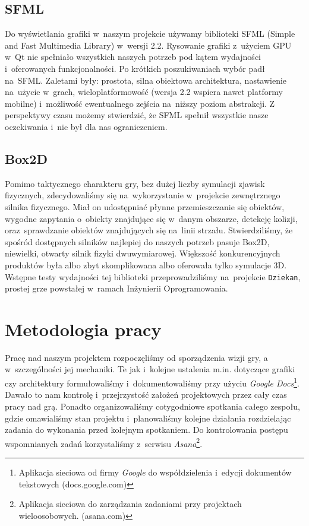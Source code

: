 \documentclass[licencjacka]{pracamgr}
\begin{document}
    \subsection{SFML}
      Do wyświetlania grafiki w~naszym projekcie używamy biblioteki SFML\cite{SFML} (Simple and Fast Multimedia Library) w~wersji
      2.2. Rysowanie grafiki z~użyciem GPU w~Qt nie spełniało wszystkich naszych potrzeb pod kątem wydajności i~oferowanych funkcjonalności.
      Po krótkich poszukiwaniach wybór padł na~SFML. Zaletami były: prostota, silna obiektowa architektura, nastawienie na~użycie w~grach,
      wieloplatformowość (wersja 2.2 wspiera nawet platformy mobilne) i~możliwość ewentualnego zejścia na~niższy poziom abstrakcji.
      Z perspektywy czasu możemy stwierdzić, że SFML spełnił wszystkie nasze oczekiwania i~nie był dla nas ograniczeniem.

    \subsection{Box2D}
      Pomimo taktycznego charakteru gry, bez dużej liczby symulacji zjawisk fizycznych, zdecydowaliśmy się na~wykorzystanie
      w~projekcie zewnętrznego silnika fizycznego. Miał on udostępniać płynne przemieszczanie się obiektów, wygodne
      zapytania o~obiekty znajdujące się w~danym obszarze, detekcję kolizji, oraz~sprawdzanie obiektów znajdujących się na~linii
      strzału. Stwierdziliśmy, że spośród dostępnych silników najlepiej do naszych potrzeb pasuje Box2D\cite{BOX}, niewielki,
      otwarty silnik fizyki dwuwymiarowej. Większość konkurencyjnych produktów była albo zbyt skomplikowana albo oferowała tylko
      symulacje 3D. Wstępne testy wydajności tej biblioteki przeprowadziliśmy na~projekcie \texttt{Dziekan}, prostej grze powstałej
      w~ramach Inżynierii Oprogramowania.

  \section{Metodologia pracy}
    Pracę nad naszym projektem rozpoczęliśmy od sporządzenia wizji gry, a w~szczególności jej mechaniki. Te jak i~kolejne
    ustalenia m.in. dotyczące grafiki czy architektury formułowaliśmy i~dokumentowaliśmy przy użyciu \emph{Google Docs}\footnote{Aplikacja 
    sieciowa od firmy \emph{Google} do współdzielenia i~edycji dokumentów tekstowych (docs.google.com)}. Dawało to nam kontrolę i~przejrzystość
    założeń projektowych przez cały czas pracy nad grą. Ponadto organizowaliśmy cotygodniowe spotkania całego zespołu, gdzie omawialiśmy stan projektu
    i~planowaliśmy kolejne działania rozdzielając zadania do wykonania przed kolejnym spotkaniem. Do kontrolowania postępu wspomnianych zadań korzystaliśmy
    z~serwisu \emph{Asana}\footnote{Aplikacja sieciowa do zarządzania zadaniami przy projektach wieloosobowych. (asana.com)}.
\end{document}
